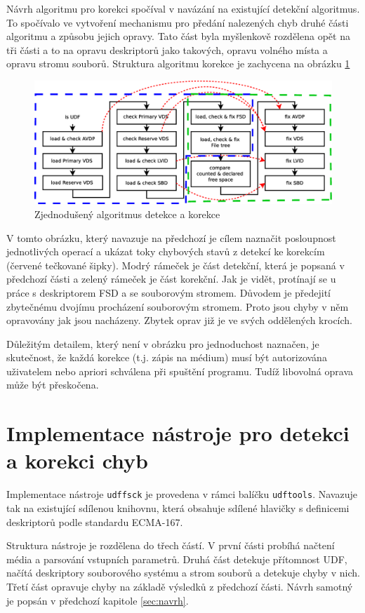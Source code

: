 Návrh algoritmu pro korekci spočíval v navázání na existující detekční algoritmus. To spočívalo ve vytvoření mechanismu pro předání nalezených chyb druhé části algoritmu a způsobu jejich opravy. Tato část byla myšlenkově rozdělena opět na tři části a to na opravu deskriptorů jako takových, opravu volného místa a opravu stromu souborů. Struktura algoritmu korekce je zachycena na obrázku \ref{fig:steps-korekce}
\begin{figure}[h] 
    \centering
    \includegraphics[scale=0.4]{obrazky/steps-korekce.eps}
    \caption{Zjednodušený algoritmus detekce a korekce}
    \label{fig:steps-korekce}
\end{figure}
V tomto obrázku, který navazuje na předchozí je cílem naznačit posloupnost jednotlivých operací a ukázat toky chybových stavů z detekcí ke korekcím (červené tečkované šipky). Modrý rámeček je část detekční, která je popsaná v předchozí části a zelený rámeček je část korekční. Jak je vidět, protínají se u práce s deskriptorem FSD a se souborovým stromem. Důvodem je předejití zbytečnému dvojímu procházení souborovým stromem. Proto jsou chyby v něm opravovány jak jsou nacházeny. Zbytek oprav již je ve svých oddělených krocích.

Důležitým detailem, který není v obrázku pro jednoduchost naznačen, je skutečnost, že každá korekce (t.j. zápis na médium) musí být autorizována uživatelem nebo apriori schválena při spuštění programu. Tudíž libovolná oprava může být přeskočena.

\section{Implementace nástroje pro detekci a korekci chyb}
\label{sec:implementace}
Implementace nástroje \texttt{udffsck} je provedena v rámci balíčku \texttt{udftools}. Navazuje tak na existující sdílenou knihovnu, která obsahuje sdílené hlavičky s definicemi deskriptorů podle standardu ECMA-167.

Struktura nástroje je rozdělena do třech částí. V první části probíhá načtení média a parsování vstupních parametrů. Druhá část detekuje přítomnost UDF, načítá deskriptory souborového systému a strom souborů a detekuje chyby v nich. Třetí část opravuje chyby na základě výsledků z předchozí části. Návrh samotný je popsán v předchozí kapitole \ref{sec:navrh}.

